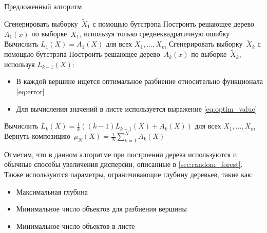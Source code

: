 \documentclass{article}
\begin{document}
\begin{algorithm}[H]
\caption{Предложенный алгоритм}
    \begin{algorithmic}[1]
      \STATE Сгенерировать выборку~$\tilde X_1$ с помощью бутстрэпа
      \STATE Построить решающее дерево~$A_1(x)$ по выборке~$\tilde X_1$, используя только среднеквадратичную ошибку
      \STATE Вычислить $L_1(X) = A_1(X)$ для всех $X_1, \dots, X_m$
            \STATE Сгенерировать выборку~$\tilde X_k$ с помощью бутстрэпа
            \STATE Построить решающее дерево~$A_k(x)$ по выборке~$\tilde X_k$, используя $L_{k-1}(X)$:
                \begin{itemize}
                    \item В каждой вершине ищется оптимальное разбиение относительно функционала \eqref{eq:error}
                    \item Для вычисления значений в листе используется выражение \eqref{eq:optim_value}
                \end{itemize}
              
            \STATE Вычислить $L_{k}(X) = \frac{1}{k} ((k-1)L_{k-1}(X) + A_k(X))$ для всех $X_1, \dots, X_m$
        \ENDFOR
        \STATE Вернуть композицию~$\mu_N(X) = \frac{1}{N} \sum_{k = 1}^{N} A_k(X)$
    \end{algorithmic}
\end{algorithm}

Отметим, что в данном алгоритме при построении дерева используются и обычные способы увеличения дисперсии, описанные в \autoref{sec:random_forest}. Также используются параметры, ограничивающие глубину деревьев, такие как:
\begin{itemize}
  \item Максимальная глубина
  \item Минимальное число объектов для разбиения вершины
  \item Минимальное число объектов в листе
\end{itemize}


\end{document}
